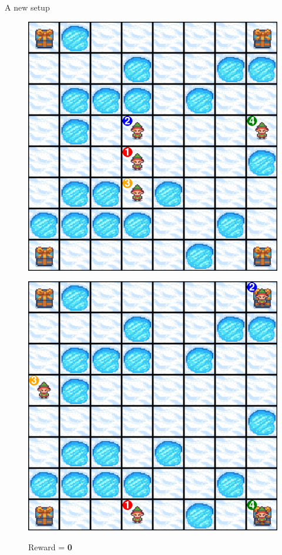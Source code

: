 \documentclass[aspectratio=169,xcolor=dvipsnames]{beamer}
\begin{document}
\begin{frame}{A new setup}

    \begin{figure}[h!]
        \centering
        \begin{minipage}{0.3\textwidth} 
            \centering
            \includegraphics[scale=0.2]{images/step_000.png}
            \caption{Reward = \textbf{0}}
        \end{minipage}%
        \hspace{10pt}
        \begin{minipage}{0.3\textwidth} 
            \centering
            \href{https://raw.githubusercontent.com/edabier/MARL-project/main/game_gif/frozen4winGIF.gif}{\includegraphics[scale=0.2]{images/step_007.png}}

\end{minipage}
\end{figure}
\end{frame}
\end{document}
